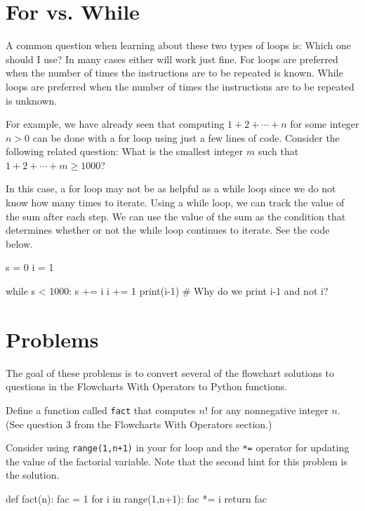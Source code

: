 \documentclass{ximera}
\begin{document}
\section{For vs. While}

A common question when learning about these two types of loops is: Which one should I use? In many cases either will work just fine. For loops are preferred when the number of times the instructions are to be repeated is known. While loops are preferred when the number of times the instructions are to be repeated is unknown.

For example, we have already seen that computing $1+2+\cdots+n$ for some integer $n>0$ can be done with a for loop using just a few lines of code. Consider the following related question: What is the smallest integer $m$ such that $1+2+\cdots+m\geq 1000$?

In this case, a for loop may not be as helpful as a while loop since we do not know how many times to iterate. Using a while loop, we can track the value of the sum after each step. We can use the value of the sum as the condition that determines whether or not the while loop continues to iterate. See the code below.

\begin{sageCell}
s = 0
i = 1

while s < 1000:
        s += i
        i += 1
print(i-1)  # Why do we print i-1 and not i?
\end{sageCell}

\section{Problems}

The goal of these problems is to convert several of the flowchart solutions to questions in the Flowcharts With Operators to Python functions.

\begin{question}
	Define a function called \verb|fact| that computes $n!$ for any nonnegative integer $n$. (See question 3 from the Flowcharts With Operators section.)
	\begin{hint}
	Consider using \verb|range(1,n+1)| in your for loop and the \verb|*=| operator for updating the value of the factorial variable. Note that the second hint for this problem is the solution.
	\end{hint}
	\begin{hint}
\begin{sageCell}
def fact(n):
        fac = 1
        for i in range(1,n+1):
                fac *= i
        return fac
\end{sageCell}
	\end{hint}
\end{question}
\end{document}
